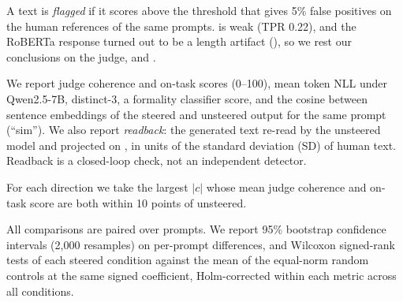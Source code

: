 A text is {\em flagged} if it scores above the threshold that gives 5\% false positives on the human references of the same prompts.
\radar is weak (TPR 0.22), and the \hcthree RoBERTa response turned out to be a length artifact (), so we rest our conclusions on the judge, \desklib and \bino.

 We report judge coherence and on-task scores (0--100), mean token NLL under Qwen2.5-7B, distinct-3, a formality classifier score, and the cosine between sentence embeddings of the steered and unsteered output for the same prompt (``sim'').
We also report {\em readback}: the generated text re-read by the unsteered model and projected on \airead, in units of the standard deviation (SD) of human text. Readback is a closed-loop check, not an independent detector.

 For each direction we take the largest $|c|$ whose mean judge coherence and on-task score are both within 10 points of unsteered.

 All comparisons are paired over prompts.
We report 95\% bootstrap confidence intervals (2{,}000 resamples) on per-prompt differences, and Wilcoxon signed-rank tests of each steered condition against the mean of the equal-norm random controls at the same signed coefficient, Holm-corrected within each metric across all conditions.
